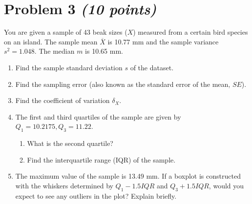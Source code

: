 \documentclass[11pt,twoside]{article}
\newcommand{\pts}[1]{\marginpar{ \small\hspace{0pt} \textit{[#1]} } }
\numberwithin{equation}{section}
\newcommand{\?}{\stackrel{?}{=}}
\newcommand{\ol}{\overline}
\newcommand{\gr}{\color{green!40!black}}
\begin{document}
\section*{Problem 3 \textit{(10 points)}}
You are given a sample of 43 beak sizes ($X$) measured from a certain bird species on an island.
The sample  mean $\ol X$ is 10.77 mm and the sample variance $s^{2} = 1.048$. The median $m$ is 10.65 mm.
\begin{enumerate}[\bf (a)]
\item Find the sample standard deviation $s$ of the dataset.\pts{2}
   \vspace{18ex}

\item Find the sampling error (also known as the standard error of the mean, $SE$). \pts{2}
   \vspace{18ex}


\item Find the coefficient of variation $\delta_{X}$. \pts{2}
   \vspace{18ex}

\item The first and third  quartiles of the sample are given by $Q_{1} = 10.2175, Q_{3} = 11.22$.
  \begin{enumerate}[\bf (i)]
  \item What is the second \pts{1} quartile? %
   \bigskip
   \bigskip
    
  \item Find the interquartile range (IQR) of the sample.\pts{1}
   \vspace{12ex}

  \end{enumerate}

\item The maximum value of the sample is 13.49 mm. \pts{2} If a boxplot is constructed with the whiskers determined by $Q_{1} - 1.5IQR$ and $Q_{3}+1.5IQR$, would you expect to see any outliers in the plot? Explain briefly.

     \vspace{25ex}

\end{enumerate}




   
\end{document}
